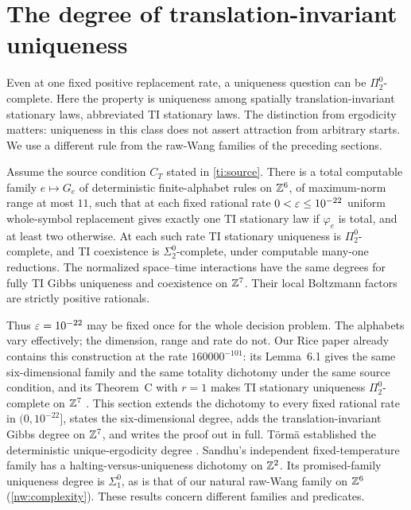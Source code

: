 \section{The degree of translation-invariant uniqueness}\label{sec:ti-degree}

Even at one fixed positive replacement rate, a uniqueness question can be $\Pi^0_2$-complete. Here the property is uniqueness among spatially translation-invariant stationary laws, abbreviated TI stationary laws. The distinction from ergodicity matters: uniqueness in this class does not assert attraction from arbitrary starts. We use a different rule from the raw-Wang families of the preceding sections.

\begin{theorem}\label{ti:degree}
Assume the source condition $C_T$ stated in \cref{ti:source}. There is a total computable family $e\mapsto G_e$ of deterministic finite-alphabet rules on $\mathbb{Z}^6$, of maximum-norm range at most $11$, such that at each fixed rational rate $0<\varepsilon\le10^{-22}$ uniform whole-symbol replacement gives exactly one TI stationary law if $\varphi_e$ is total, and at least two otherwise. At each such rate TI stationary uniqueness is $\Pi^0_2$-complete, and TI coexistence is $\Sigma^0_2$-complete, under computable many-one reductions. The normalized space--time interactions have the same degrees for fully TI Gibbs uniqueness and coexistence on $\mathbb{Z}^7$. Their local Boltzmann factors are strictly positive rationals.
\end{theorem}

Thus $\varepsilon=10^{-22}$ may be fixed once for the whole decision problem. The alphabets vary effectively; the dimension, range and rate do not. Our Rice paper already contains this construction at the rate $160000^{-101}$: its Lemma~6.1 gives the same six-dimensional family and the same totality dichotomy under the same source condition, and its Theorem~C with $r=1$ makes TI stationary uniqueness $\Pi^0_2$-complete on $\mathbb{Z}^7$ \cite[Lemma~6.1 and Theorem~C]{DMrice}. This section extends the dichotomy to every fixed rational rate in $(0,10^{-22}]$, states the six-dimensional degree, adds the translation-invariant Gibbs degree on $\mathbb{Z}^7$, and writes the proof out in full. T\"orm\"a established the deterministic unique-ergodicity degree \cite[Proposition~48]{Torma15}. Sandhu's independent fixed-temperature family \cite[Theorem~1.1]{Sandhu26} has a halting-versus-uniqueness dichotomy on $\mathbb{Z}^2$. Its promised-family uniqueness degree is $\Sigma^0_1$, as is that of our natural raw-Wang family on $\mathbb{Z}^6$ (\cref{nw:complexity}). These results concern different families and predicates.

